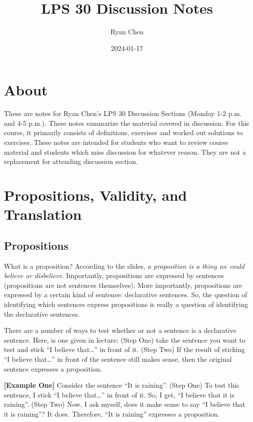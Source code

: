 \documentclass[
]{book}
\title{LPS 30 Discussion Notes}
\author{Ryan Chen}
\date{2024-01-17}
\begin{document}
\maketitle

{
\setcounter{tocdepth}{1}
\tableofcontents
}
\hypertarget{about}{%
\chapter{About}\label{about}}

These are notes for Ryan Chen's LPS 30 Discussion Sections (Monday 1-2 p.m. and 4-5 p.m.). These notes summarize the material covered in discussion. For this course, it primarily consists of definitions, exercises and worked out solutions to exercises. These notes are intended for students who want to review course material and students which miss discussion for whatever reason. They are not a replacement for attending discussion section.

\hypertarget{propositions-validity-and-translation}{%
\chapter{Propositions, Validity, and Translation}\label{propositions-validity-and-translation}}

\hypertarget{propositions}{%
\section{Propositions}\label{propositions}}

What is a proposition? According to the slides, \emph{a proposition is a thing we could believe or disbelieve}. Importantly, propositions are expressed by sentences (propositions are not sentences themselves). More importantly, propositions are expressed by a certain kind of sentence: declarative sentences. So, the question of identifying which sentences express propositions is really a question of identifying the declarative sentences.

There are a number of ways to test whether or not a sentence is a declarative sentence. Here, is one given in lecture: (Step One) take the sentence you want to test and stick ``I believe that\ldots{}'' in front of it. (Step Two) If the result of sticking ``I believe that\ldots{}'' in front of the sentence still makes sense, then the original sentence expresses a proposition.

\textbf{{[}Example One{]}} Consider the sentence ``It is raining''. (Step One) To test this sentence, I stick ``I believe that\ldots{}'' in front of it. So, I get, ``I believe that it is raining''. (Step Two) Now, I ask myself, does it make sense to say ``I believe that it is raining''? It does. Therefore, ``It is raining'' expresses a proposition.
\end{document}
